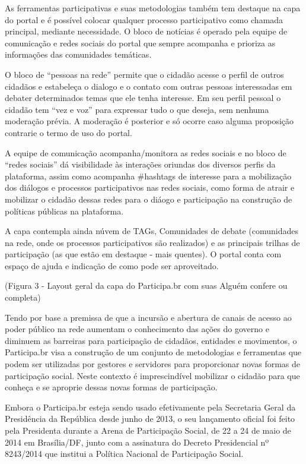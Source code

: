\documentclass{article}
\begin{document}
As ferramentas participativas e suas metodologias também tem destaque na capa
do portal e é possível colocar qualquer processo participativo como chamada
principal, mediante necessidade. O bloco de notícias é operado pela equipe de
comunicação e redes sociais do portal que sempre acompanha e prioriza as
informações das comunidades temáticas.

O bloco de ``pessoas na rede'' permite que o cidadão acesse o perfil de outros
cidadãos e estabeleça o dialogo e o contato com outras pessoas interessadas em
debater determinados temas que ele tenha interesse. Em seu perfil pessoal o
cidadão tem ``vez e voz'' para expressar tudo o que deseja, sem nenhuma moderação
prévia. A moderação é posterior e só ocorre caso alguma proposição contrarie o
termo de uso do portal.

A equipe de comunicação acompanha/monitora as redes sociais e no bloco de
``redes sociais''  dá visibilidade às interações oriundas dos diversos perfis da
plataforma, assim como acompanha \#hashtags de interesse para a mobilização dos
diálogos e processos participativos nas redes sociais, como forma de atrair e
mobilizar o cidadão dessas redes para o diáogo e participação na construção de
políticas públicas na plataforma.

A capa contempla ainda núvem de TAGs, Comunidades de debate (comunidades na
rede, onde os processos participativos são realizados) e as principais trilhas
de participação (as que estão em destaque - mais quentes). O portal conta com
espaço de ajuda e indicação de como pode ser aproveitado.
 
(Figura 3 - Layout geral da capa do Participa.br com suas Alguém confere ou completa)

Tendo por base a premissa de que a incursão e abertura de canais de acesso ao
poder público na rede aumentam o conhecimento das ações do governo e diminuem
as barreiras para participação de cidadãos, entidades e movimentos, o
Participa.br visa a construção de um conjunto de metodologias e ferramentas que
podem ser utilizadas por gestores e servidores para proporcionar novas formas
de participação social. Neste contexto é imprescindível mobilizar o cidadão
para que conheça e se aproprie dessas novas formas de participação.

Embora o Participa.br esteja sendo usado efetivamente pela Secretaria Geral
da Presidência da República desde junho de 2013, o seu lançamento oficial foi
feito pela Presidenta durante a Arena de Participação Social, de 22 a 24 de
maio de 2014 em Brasília/DF, junto com a assinatura do Decreto Presidencial nº
8243/2014 que institui a Política Nacional de Participação Social.
\end{document}

